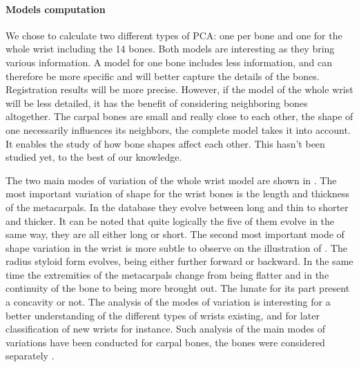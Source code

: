 \paragraph{Models computation}

We chose to calculate two different types of PCA: one per bone and one for the whole wrist including the 14 bones. Both models are interesting as they bring various information. A model for one bone includes less information, and can therefore be more specific and will better capture the details of the bones. Registration results will be more precise. However, if the model of the whole wrist will be less detailed, it has the benefit of considering neighboring bones altogether. The carpal bones are small and really close to each other, the shape of one necessarily influences its neighbors, the complete model takes it into account. It enables the study of how bone shapes affect each other. This hasn't been studied yet, to the best of our knowledge. 

The two main modes of variation of the whole wrist model are shown in . The most important variation of shape for the wrist bones is the length and thickness of the metacarpals. In the database they evolve between long and thin to shorter and thicker. It can be noted that quite logically the five of them evolve in the same way, they are all either long or short. The second most important mode of shape variation in the wrist is more subtle to observe on the illustration of . The radius styloid form evolves, being either further forward or backward. In the same time the extremities of the metacarpals change from being flatter and in the continuity of the bone to being more brought out. The lunate for its part present a concavity or not. The analysis of the modes of variation is interesting for a better understanding of the different types of wrists existing, and for later classification of new wrists for instance. Such analysis of the main modes of variations have been conducted for carpal bones, the bones were considered separately \cite{vandegiessen_2010_sca}.

